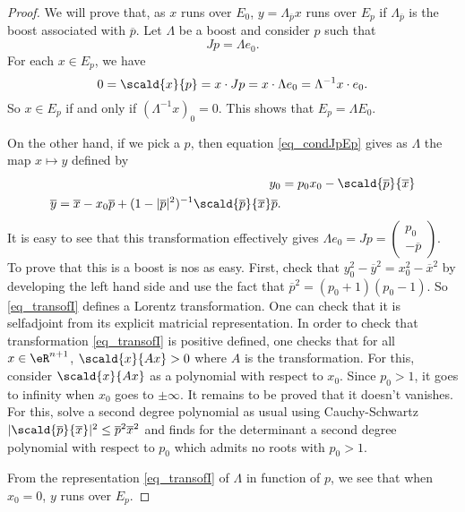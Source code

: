 \begin{proof}
We will prove that, as $x$ runs over $E_0$, $y=\Lambda_{\overline{p}}x$ runs over $E_p$ if $\Lambda_{\overline{p}}$ is the boost associated with $\overline{p}$. Let $\Lambda$ be a boost and consider $p$ such that 
\begin{equation}  \label{eq_condJpEp}
Jp=\Lambda e_0.
\end{equation}
For each $x\in E_p$, we have
\[ 
  0=\scald{ x }{ p }=x\cdot Jp=x\cdot\Lambda e_0=\Lambda^{-1}x\cdot e_0.
\]
So $x\in E_p$ if and only if $(\Lambda^{-1}x)_0=0$. This shows that $E_p=\Lambda E_0$.

On the other hand, if we pick a $p$, then equation \eqref{eq_condJpEp} gives as $\Lambda$ the map $x\mapsto y$ defined by
 \begin{subequations} \label{eq_transofI}
\begin{align}
  y_0&=p_0x_0-\scald{ \overline{p} }{ \overline{x} }\\
\overline{ y }=\overline{x}-x_0\overline{p}+(1-|\overline{p}|^2)^{-1}\scald{ \overline{p} }{ \overline{x} }\overline{p}.
\end{align}
\end{subequations}
It is easy to see that this transformation effectively gives $\Lambda e_0=Jp=
\begin{pmatrix}
p_0\\-\overline{p}
\end{pmatrix}
$. To prove that this is a boost is nos as easy. First, check that $y_0^2-\overline{ y }^2=x_0^2-\overline{x}^2$ by developing the left hand side and use the fact that $\overline{p}^2=(p_0+1)(p_0-1)$. So \eqref{eq_transofI} defines a Lorentz transformation. One can check that it is selfadjoint from its explicit matricial representation. In order to check that transformation \eqref{eq_transofI} is positive defined, one checks that for all $x\in\eR^{n+1}$,  $\scald{ x }{ Ax }>0$ where $A$ is the transformation. For this, consider $\scald{ x }{ Ax }$ as a polynomial with respect to $x_0$. Since $p_0>1$, it goes to infinity when $x_0$ goes to $\pm\infty$. It remains to be proved that it doesn't vanishes. For this, solve a second degree polynomial as usual using Cauchy-Schwartz $| \scald{ \overline{p} }{ \overline{x} } |^2\leq \overline{p}^2\overline{x}^2$ and finds for the determinant a second degree polynomial with respect to $p_0$ which admits no roots with $p_0>1$.

From the representation \eqref{eq_transofI} of $\Lambda$ in function of $p$, we see that when $x_0=0$, $y$ runs over $E_p$.  

\end{proof}

